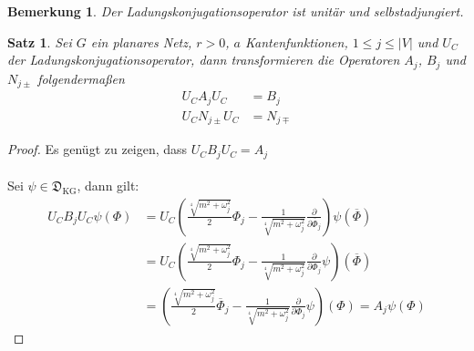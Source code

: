 \documentclass[11pt,a4paper,leqno]{report}
\newtheorem{proposition}{Satz}[chapter]
\newtheorem{remark}[theorem]{Bemerkung}
\numberwithin{equation}{chapter}
\begin{document}
\begin{remark}
	Der Ladungskonjugationsoperator ist unit\"ar und selbstadjungiert.
\end{remark}
\begin{proposition}
	Sei $G$ ein planares Netz, $r>0$, $a$ Kantenfunktionen, $1\leq j \leq |V| $ und $U_C$ der Ladungskonjugationsoperator, dann transformieren die Operatoren $A_j$, $B_j$ und $N_{j\pm}$ folgenderma\ss{}en
	\begin{align}
	U_CA_j U_C &= B_j\\
	U_C N_{j \pm} U_C &= N_{j \mp}
\end{align}
\end{proposition}
\begin{proof}
	Es genügt zu zeigen, dass \(U_CB_j U_C=A_j\)\\
	\\
	Sei \(\psi \in \mathfrak{D}_{\mathrm{KG}}\), dann gilt:
	\begin{align*}
		U_CB_j U_C\psi(\Phi)&=U_C(\frac{\sqrt[4]{m^2 + \omega_j^2}}{2}\Phi_{j} - \frac{1}{\sqrt[4]{m^2 + \omega_j^2}}\frac{\partial}{\partial\overline{\Phi}_{j}})\psi(\overline{\Phi})\\
		&=U_C(\frac{\sqrt[4]{m^2 + \omega_j^2}}{2}\Phi_{j} - \frac{1}{\sqrt[4]{m^2 + \omega_j^2}}\frac{\partial}{\partial{\Phi}_{j}}\psi)(\overline{\Phi})
		\\
		&=(\frac{\sqrt[4]{m^2 + \omega_j^2}}{2}\overline{\Phi}_{j} - \frac{1}{\sqrt[4]{m^2 + \omega_j^2}}\frac{\partial}{\partial{\Phi}_{j}}\psi)(\Phi)=A_j\psi(\Phi)
	\end{align*}
\end{proof}

\end{document}
